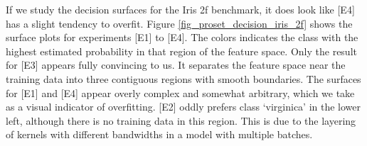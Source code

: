 %
If we study the decision surfaces for the Iris 2f benchmark, it does look like [E4] has a slight tendency to overfit.
Figure \ref{fig_proset_decision_iris_2f} shows the surface plots for experiments [E1] to [E4].
The colors indicates the class with the highest estimated probability in that region of the feature space.
Only the result for [E3] appears fully convincing to us.
It separates the feature space near the training data into three contiguous regions with smooth boundaries.
The surfaces for [E1] and [E4] appear overly complex and somewhat arbitrary, which we take as a visual indicator of overfitting.
[E2] oddly prefers class `virginica' in the lower left, although there is no training data in this region.
This is due to the layering of kernels with different bandwidths in a model with multiple batches.\par
%
\clearpage
%
